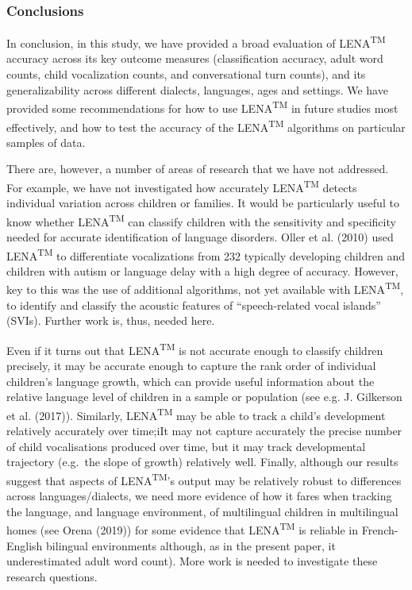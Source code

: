 \documentclass[english,floatsintext,man]{apa6}
\begin{document}
\subsubsection{Conclusions}\label{conclusions}

In conclusion, in this study, we have provided a broad evaluation of
LENA\textsuperscript{TM} accuracy across its key outcome measures
(classification accuracy, adult word counts, child vocalization counts,
and conversational turn counts), and its generalizability across
different dialects, languages, ages and settings. We have provided some
recommendations for how to use LENA\textsuperscript{TM} in future
studies most effectively, and how to test the accuracy of the
LENA\textsuperscript{TM} algorithms on particular samples of data.

There are, however, a number of areas of research that we have not
addressed. For example, we have not investigated how accurately
LENA\textsuperscript{TM} detects individual variation across children or
families. It would be particularly useful to know whether
LENA\textsuperscript{TM} can classify children with the sensitivity and
specificity needed for accurate identification of language disorders.
Oller et al. (2010) used LENA\textsuperscript{TM} to differentiate
vocalizations from 232 typically developing children and children with
autism or language delay with a high degree of accuracy. However, key to
this was the use of additional algorithms, not yet available with
LENA\textsuperscript{TM}, to identify and classify the acoustic features
of \enquote{speech-related vocal islands} (SVIs). Further work is, thus,
needed here.

Even if it turns out that LENA\textsuperscript{TM} is not accurate
enough to classify children precisely, it may be accurate enough to
capture the rank order of individual children's language growth, which
can provide useful information about the relative language level of
children in a sample or population (see e.g. J. Gilkerson et al.
(2017)). Similarly, LENA\textsuperscript{TM} may be able to track a
child's development relatively accurately over time;iIt may not capture
accurately the precise number of child vocalisations produced over time,
but it may track developmental trajectory (e.g.~the slope of growth)
relatively well. Finally, although our results suggest that aspects of
LENA\textsuperscript{TM}'s output may be relatively robust to
differences across languages/dialects, we need more evidence of how it
fares when tracking the language, and language environment, of
multilingual children in multilingual homes (see Orena (2019)) for some
evidence that LENA\textsuperscript{TM} is reliable in French-English
bilingual environments although, as in the present paper, it
underestimated adult word count). More work is needed to investigate
these research questions.
\end{document}
